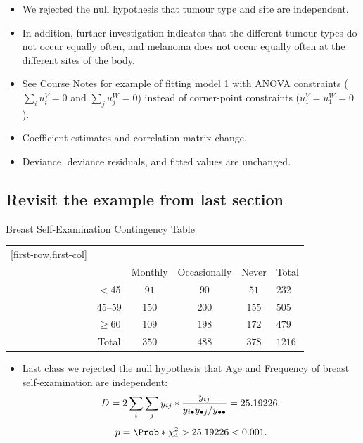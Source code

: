 \documentclass[oneside]{book}\usepackage[]{graphicx}\usepackage[svgnames]{xcolor}
\let\log\relax%
\begin{document}
\begin{itemize}
      \item We rejected the null hypothesis that tumour type and site are independent.
      \item In addition, further investigation indicates that the different tumour types do not
            occur equally often, and melanoma does not occur equally often at the different
            sites of the body.
      \item See Course Notes for example of fitting model 1 with ANOVA constraints
            ($ \sum_i u_i^V=0 $ and $ \sum_j u_j^W =0$) instead of corner-point constraints ($ u_1^V=u_1^W=0 $).
      \item Coefficient estimates and correlation matrix change.
      \item Deviance, deviance residuals, and fitted values are unchanged.
\end{itemize}
\subsection*{Revisit the example from last section}
\begin{Example}{Breast Self-Examination Contingency Table}
      \begin{center}
            \begin{NiceTabular}{c|ccc|c}[first-row,first-col]
                  &&\\
                  && Monthly & Occasionally & Never & Total\\
                  \midrule
                   & $<$45 & $ 91 $ & $ 90 $ & $ 51 $ & $ 232 $\\
                  & 45--59 & $ 150 $ & $ 200 $ & $ 155 $ & $ 505 $\\
                  & $ \ge $60 & $ 109 $ & $ 198 $ & $ 172 $ & $ 479 $\\
                  \midrule
                  & Total & $ 350 $ & $ 488 $ & $ 378 $ & $ 1216 $
            \end{NiceTabular}
      \end{center}
\end{Example}
\begin{itemize}
      \item Last class we rejected the null hypothesis that Age and Frequency of breast
            self-examination are independent:
            \[ D=2\sum_i\sum_j y_{ij}\log*{\frac{y_{ij}}{y_{i\bullet}y_{\bullet j}/y_{\bullet\bullet}}}=25.19226. \]
            \[ p=\Prob*{\chi^2_{4}>25.19226}<0.001. \]
\end{itemize}
\end{document}
